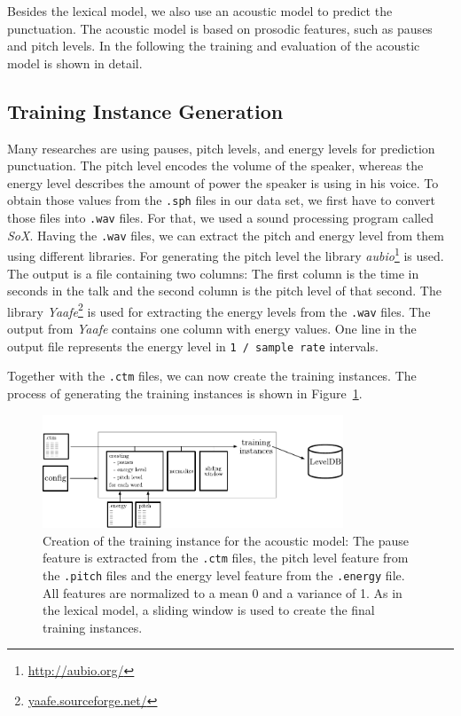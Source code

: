 Besides the lexical model, we also use an acoustic model to predict the punctuation.
The acoustic model is based on prosodic features, such as pauses and pitch levels.
In the following the training and evaluation of the acoustic model is shown in detail.

\subsection{Training Instance Generation}

Many researches are using pauses, pitch levels, and energy levels for prediction punctuation.
The pitch level encodes the volume of the speaker, whereas the energy level describes the amount of power the speaker is using in his voice.
To obtain those values from the \texttt{.sph} files in our data set, we first have to convert those files into \texttt{.wav} files.
For that, we used a sound processing program called \emph{SoX}.
Having the \texttt{.wav} files, we can extract the pitch and energy level from them using different libraries.
For generating the pitch level the library \emph{aubio}\footnote{\url{http://aubio.org/}} is used.
The output is a file containing two columns: The first column is the time in seconds in the talk and the second column is the pitch level of that second.
The library \emph{Yaafe}\footnote{\url{yaafe.sourceforge.net/}} is used for extracting the energy levels from the \texttt{.wav} files.
The output from \emph{Yaafe} contains one column with energy values.
One line in the output file represents the energy level in \texttt{1 / sample rate} intervals.

Together with the \texttt{.ctm} files, we can now create the training instances.
The process of generating the training instances is shown in Figure~\ref{fig:overview_acoustic}.
\begin{figure}[ht]
    \centering
    \includegraphics[width=0.8\textwidth]{img/overview_accoustic.pdf}
    \caption{Creation of the training instance for the acoustic model: The pause feature is extracted from the \texttt{.ctm} files, the pitch level feature from the \texttt{.pitch} files and the energy level feature from the \texttt{.energy} file. All features are normalized to a mean 0 and a variance of 1. As in the lexical model, a sliding window is used to create the final training instances.}
    \label{fig:overview_acoustic}
\end{figure}

